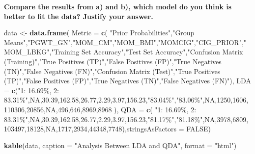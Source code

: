 \documentclass[
]{article}
\newenvironment{Shaded}{\begin{snugshade}}{\end{snugshade}}
\newcommand{\AttributeTok}[1]{\textcolor[rgb]{0.13,0.29,0.53}{#1}}
\newcommand{\ConstantTok}[1]{\textcolor[rgb]{0.56,0.35,0.01}{#1}}
\newcommand{\DecValTok}[1]{\textcolor[rgb]{0.00,0.00,0.81}{#1}}
\newcommand{\FloatTok}[1]{\textcolor[rgb]{0.00,0.00,0.81}{#1}}
\newcommand{\FunctionTok}[1]{\textcolor[rgb]{0.13,0.29,0.53}{\textbf{#1}}}
\newcommand{\NormalTok}[1]{#1}
\newcommand{\OtherTok}[1]{\textcolor[rgb]{0.56,0.35,0.01}{#1}}
\newcommand{\StringTok}[1]{\textcolor[rgb]{0.31,0.60,0.02}{#1}}
\begin{document}
\textbf{Compare the results from a) and b), which model do you think is
better to fit the data? Justify your answer.}\\

\begin{Shaded}
\begin{Highlighting}[]
\NormalTok{data }\OtherTok{\textless{}{-}} \FunctionTok{data.frame}\NormalTok{(}
  \AttributeTok{Metric =} \FunctionTok{c}\NormalTok{(}
    \StringTok{"Prior Probabilities"}\NormalTok{,}\StringTok{"Group Means"}\NormalTok{,}\StringTok{"PGWT\_GN"}\NormalTok{,}\StringTok{"MOM\_CM"}\NormalTok{,}\StringTok{"MOM\_BMI"}\NormalTok{,}\StringTok{"MOMCIG"}\NormalTok{,}\StringTok{"CIG\_PRIOR"}\NormalTok{,}\StringTok{"MOM\_LBKG"}\NormalTok{,}\StringTok{"Training Set Accuracy"}\NormalTok{,}\StringTok{"Test Set Accuracy"}\NormalTok{,}\StringTok{"Confusion Matrix (Training)"}\NormalTok{,}\StringTok{"True Positives (TP)"}\NormalTok{,}\StringTok{"False Positives (FP)"}\NormalTok{,}\StringTok{"True Negatives (TN)"}\NormalTok{,}\StringTok{"False Negatives (FN)"}\NormalTok{,}\StringTok{"Confusion Matrix (Test)"}\NormalTok{,}\StringTok{"True Positives (TP)"}\NormalTok{,}\StringTok{"False Positives (FP)"}\NormalTok{,}\StringTok{"True Negatives (TN)"}\NormalTok{,}\StringTok{"False Negatives (FN)"}\NormalTok{),}
  \AttributeTok{LDA =} \FunctionTok{c}\NormalTok{(}\StringTok{"1: 16.69\%, 2: 83.31\%"}\NormalTok{,}\ConstantTok{NA}\NormalTok{,}\FloatTok{30.39}\NormalTok{,}\FloatTok{162.58}\NormalTok{,}\FloatTok{26.77}\NormalTok{,}\FloatTok{2.29}\NormalTok{,}\FloatTok{3.97}\NormalTok{,}\FloatTok{156.23}\NormalTok{,}\StringTok{"83.04\%"}\NormalTok{,}\StringTok{"83.06\%"}\NormalTok{,}\ConstantTok{NA}\NormalTok{,}\DecValTok{1250}\NormalTok{,}\DecValTok{1606}\NormalTok{,}\DecValTok{110306}\NormalTok{,}\DecValTok{20856}\NormalTok{,}\ConstantTok{NA}\NormalTok{,}\DecValTok{496}\NormalTok{,}\DecValTok{646}\NormalTok{,}\DecValTok{8969}\NormalTok{,}\DecValTok{8968}
\NormalTok{  ),}
  \AttributeTok{QDA =} \FunctionTok{c}\NormalTok{(}
    \StringTok{"1: 16.69\%, 2: 83.31\%"}\NormalTok{,}\ConstantTok{NA}\NormalTok{,}\FloatTok{30.39}\NormalTok{,}\FloatTok{162.58}\NormalTok{,}\FloatTok{26.77}\NormalTok{,}\FloatTok{2.29}\NormalTok{,}\FloatTok{3.97}\NormalTok{,}\FloatTok{156.23}\NormalTok{,}\StringTok{"81.17\%"}\NormalTok{,}\StringTok{"81.18\%"}\NormalTok{,}\ConstantTok{NA}\NormalTok{,}\DecValTok{3978}\NormalTok{,}\DecValTok{6809}\NormalTok{,}\DecValTok{103497}\NormalTok{,}\DecValTok{18128}\NormalTok{,}\ConstantTok{NA}\NormalTok{,}\DecValTok{1717}\NormalTok{,}\DecValTok{2934}\NormalTok{,}\DecValTok{44348}\NormalTok{,}\DecValTok{7748}\NormalTok{),}\AttributeTok{stringsAsFactors =} \ConstantTok{FALSE}\NormalTok{)}

\FunctionTok{kable}\NormalTok{(data, }\AttributeTok{caption =} \StringTok{"Analysis Between LDA and QDA"}\NormalTok{, }\AttributeTok{format =} \StringTok{"html"}\NormalTok{)}
\end{Highlighting}
\end{Shaded}
\end{document}
